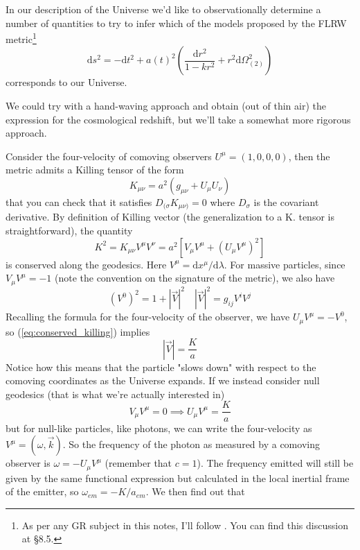 In our description of the Universe we'd like to observationally determine a number of quantities to try to infer which of the models proposed by the FLRW metric\footnote{As per any GR subject in this notes, I'll follow \cite{carroll}. You can find this discussion at §8.5.}
\begin{equation*}
    \text{d}s^{2} = -\text{d}t^{2}+a(t)^{2}\left(\frac{\text{d}r^{2}}{1-kr^{2}}+r^{2}\text{d}\Omega_{(2)}^{2}\right)
\end{equation*}
corresponds to our Universe. \par We could try with a hand-waving approach and obtain (out of thin air) the expression for the cosmological redshift, but we'll take a somewhat more rigorous approach.
\par Consider the four-velocity of comoving observers $U^{\mu} = (1,0,0,0)$, then the metric admits a Killing tensor of the form 
\begin{equation*}
    K_{\mu\nu} = a^{2}(g_{\mu\nu}+U_{\mu}U_{\nu})
\end{equation*}
that you can check that it satisfies $D_{(\sigma}K_{\mu\nu)} = 0$ where $D_{\sigma}$ is the covariant derivative. By definition of Killing vector (the generalization to a K. tensor is straightforward), the quantity 
\begin{equation}
    K^{2} = K_{\mu\nu}V^{\mu}V^{\nu} = a^{2}\left[V_{\mu}V^{\mu}+(U_{\mu}V^{\mu})^{2}\right]
    \label{eq:conserved_killing}
\end{equation}
is conserved along the geodesics. Here $V^{\mu} = \text{d}x^{\mu}/\text{d}\lambda$. For massive particles, since $V_{\mu}V^{\mu} = -1$ (note the convention on the signature of the metric), we also have
\begin{equation*}
    (V^{0})^{2} = 1+|\vec{V}|^{2} \quad |\vec{V}|^{2} = g_{ij}V^{i}V^{j}
\end{equation*}
Recalling the formula for the four-velocity of the observer, we have $U_{\mu}V^{\mu} = -V^{0}$, so (\ref{eq:conserved_killing}) implies
\begin{equation*}
    |\vec{V}| = \frac{K}{a}
\end{equation*}
Notice how this means that the particle "slows down" with respect to the comoving coordinates as the Universe expands. If we instead consider null geodesics (that is what we're actually interested in)
\begin{equation*}
    V_{\mu}V^{\mu} = 0 \implies U_{\mu}V^{\mu} = \frac{K}{a}
\end{equation*}
but for null-like particles, like photons, we can write the four-velocity as $V^{\mu} = (\omega, \vec{k})$. So the frequency of the photon as measured by a comoving observer is $\omega = -U_{\mu}V^{\mu}$ (remember that $c=1$). The frequency emitted will still be given by the same functional expression but calculated in the local inertial frame of the emitter, so $\omega_{em} = -K/a_{em}$. We then find out that 
